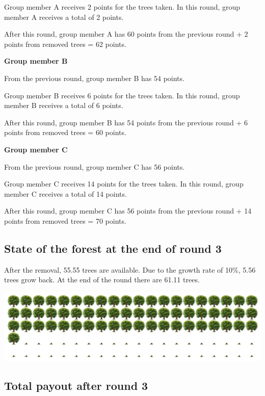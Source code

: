 \noindent Group member A receives 2 points for the trees taken. In this round, group member A receives a total of 2 points.

\noindent After this round, group member A has 60 points from the previous round + 2 points from removed trees = 62 points.

\noindent \textbf{Group member B}

\noindent From the previous round, group member B has 54 points.

\noindent Group member B receives 6 points for the trees taken. In this round, group member B receives a total of 6 points.

\noindent After this round, group member B has 54 points from the previous round + 6 points from removed trees = 60 points.

\noindent \textbf{Group member C}

\noindent From the previous round, group member C has 56 points.

\noindent Group member C receives 14 points for the trees taken. In this round, group member C receives a total of 14 points.

\noindent After this round, group member C has 56 points from the previous round + 14 points from removed trees = 70 points.

\subsection*{State of the forest at the end of round 3}

\noindent After the removal, 55.55 trees are available. Due to the growth rate of 10\%, 5.56 trees grow back. At the end of the round there are 61.11 trees.
\begin{center}
   \includegraphics[width=16cm]{../bld/graphs/A. Round3c.png}
\end{center}

\subsection*{Total payout after round 3}

